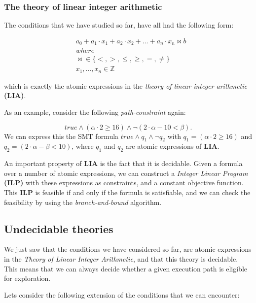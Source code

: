 	\subsubsection{The theory of linear integer arithmetic}
		The conditions that we have studied so far, have all had the following form:
		
		\begin{align*}
			& a_0 +  a_1 \cdot x_1 + a_2\cdot x_2 + \ldots + a_n \cdot x_n \bowtie b\\
			& where\\
			& \bowtie \in \{ <, >, \leq, \geq, =, \neq\}\\
			& x_1, \ldots, x_n \in \mathbb{Z}			
		\end{align*}
		
	which is exactly the atomic expressions in the \emph{theory of linear integer arithmetic} \textbf{(LIA)}. 
	
	As an example, consider the following \emph{path-constraint} again:
	
	\begin{equation}
		true \land (\alpha \cdot 2 \geq 16) \land \neg (2\cdot \alpha - 10 < \beta).
	\end{equation}	
	We can express this the SMT formula $true \land q_1 \land \neg q_2$ with $q_1 = (\alpha \cdot 2 \geq 16)$ and $q_2 = (2\cdot \alpha - \beta < 10)$, where $q_1$ and $q_2$ are atomic expressions of \textbf{LIA}.
	
	An important property of \textbf{LIA} is the fact that it is decidable. Given a formula over a number of atomic expressions, we can construct a \emph{Integer Linear Program} \textbf{(ILP)} with these expressions as constraints, and a constant objective function. This \textbf{ILP} is feasible if and only if the formula is satisfiable, and we can check the feasibility by using the \emph{branch-and-bound} algorithm.
	
	\subsection{Undecidable theories}
	
	We just saw that the conditions we have considered so far, are atomic expressions in the \emph{Theory of Linear Integer Arithmetic}, and that this theory is decidable. This means that we can always decide whether a given execution path is eligible for exploration.
	 
	Lets consider the following extension of the conditions that we can encounter:
	
